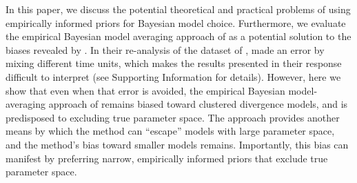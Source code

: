 \documentclass[letterpaper,12pt]{article}
\begin{document}
\begin{linenumbers}
In this paper, we discuss the potential theoretical and practical problems of
using empirically informed priors for Bayesian model choice.
Furthermore, we evaluate the empirical Bayesian model averaging approach of
\citet{Hickerson2013} as a potential solution to the biases revealed by
\citet{Oaks2012}.
In their re-analysis of the dataset of \citet{Oaks2012}, \citet{Hickerson2013}
made an error by mixing different time units, which makes the results presented
in their response difficult to interpret (see Supporting Information for
details).
However, here we show that even when that error is avoided, the empirical
Bayesian model-averaging approach of \citet{Hickerson2013} remains biased
toward clustered divergence models, and is predisposed to excluding true
parameter space.
The approach provides another means by which the method can ``escape'' models
with large parameter space, and the method's bias toward smaller models
remains.
Importantly, this bias can manifest by preferring narrow, empirically informed
priors that exclude true parameter space.








\end{linenumbers}
\end{document}
